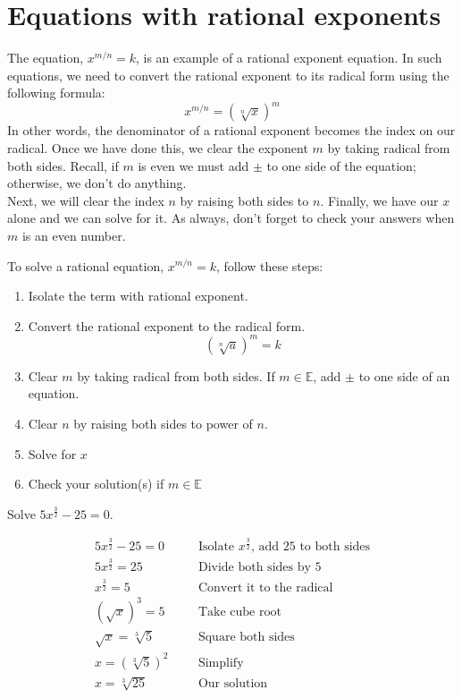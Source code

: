 \section{Equations with rational exponents}
The equation, $x^{m/n}=k$, is an example of a rational exponent equation. In such equations, we need to convert the rational exponent to its radical form using the following formula:
\begin{equation}
                x^{m/n} = \left(\sqrt[n]{x}\right)^m
\end{equation}
In other words, the denominator of a rational exponent becomes the index on our radical. Once we have done this, we clear the exponent $m$ by taking radical from both sides. Recall, if $m$ is even we must add $\pm$ to one side of the equation; otherwise, we don't do anything. \\
Next, we will clear the index $n$ by raising both sides to $n$. Finally, we have our $x$ alone and we can solve for it. As always, don't forget to check your answers when $m$ is an even number.
%
\vspace{0.4cm}
\begin{tcolorbox}[
        title=Steps to solve a equation with rational exponent, 
        colback=blue!5!white,
        colframe=blue!75!black,
        fonttitle=\bfseries]
To solve a rational equation, $x^{m/n}=k$, follow these steps:
    \begin{enumerate}[1.]
        \item Isolate the term with rational exponent.
        \item Convert the rational exponent to the radical form.
                \[\left(\sqrt[n]{a}\right)^m = k\]
        \item Clear $m$ by taking radical from both sides. If $m \in \mathbb{E}$,  add $\pm$ to one side of an equation.
        \item Clear $n$ by raising both sides to power of $n$.
        \item Solve for $x$
        \item Check your solution(s) if $m \in \mathbb{E}$
        \end{enumerate}
\end{tcolorbox}
\begin{exa}
    Solve $5x^{\frac{3}{2}}-25=0$.
\end{exa}
\begin{align*}
        5x^{\frac{3}{2}}-25=0&  &   &\text{Isolate $x^{\frac{3}{2}}$, add 25 to both sides}\\
        5x^{\frac{3}{2}}=25&    &   &\text{Divide both sides by 5}\\
        x^{\frac{3}{2}}=5&      &   &\text{Convert it to the radical}\\
        \left(\sqrt{x}\right)^3=5&   &   &\text{Take cube root}\\
        \sqrt{x}=\sqrt[3]{5}&   &   &\text{Square both sides}\\
        x = \left(\sqrt[3]{5}\right)^2& &   &\text{Simplify}\\
        x=\sqrt[3]{25}&    &   &\text{Our solution}
\end{align*}
